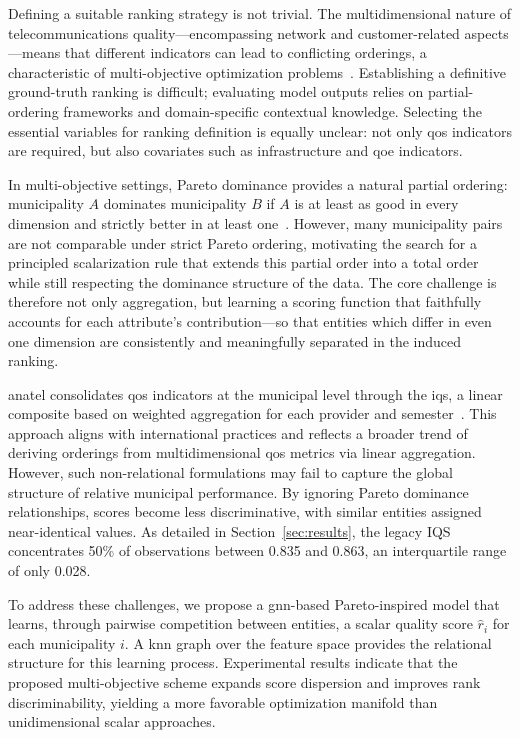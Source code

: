 \documentclass[english]{sbrt}
\begin{document}
Defining a suitable ranking strategy is not trivial. The multidimensional nature
of telecommunications quality---encompassing network and customer-related
aspects---means that different indicators can lead to conflicting orderings, a
characteristic of multi-objective optimization
problems~\cite{suresh2024machine,kesireddy2024elite}. Establishing a definitive
ground-truth ranking is difficult; evaluating model outputs relies on
partial-ordering frameworks and domain-specific contextual knowledge. Selecting
the essential variables for ranking definition is equally unclear: not only
\gls{qos} indicators are required, but also covariates such as infrastructure
and \gls{qoe} indicators.

In multi-objective settings, Pareto dominance provides a natural partial
ordering: municipality $A$ dominates municipality $B$ if $A$ is at least as good
in every dimension and strictly better in at least
one~\cite{haxhiraj2025pareto}. However, many municipality pairs are not
comparable under strict Pareto ordering, motivating the search for a principled
scalarization rule that extends this partial order into a total order while
still respecting the dominance structure of the data. The core challenge is
therefore not only aggregation, but learning a scoring function that faithfully
accounts for each attribute's contribution---so that entities which differ in
even one dimension are consistently and meaningfully separated in the induced
ranking.

\gls{anatel} consolidates \gls{qos} indicators at the municipal level through
the \gls{iqs}, a linear composite based on weighted aggregation for each
provider and semester~\cite{anatel2025ri444,anatel2021ri71}. This approach
aligns with international practices and reflects a broader trend of deriving
orderings from multidimensional \gls{qos} metrics via linear aggregation.
However, such non-relational formulations may fail to capture the global
structure of relative municipal performance. By ignoring Pareto dominance
relationships, scores become less discriminative, with similar entities assigned
near-identical values. As detailed in Section~\ref{sec:results}, the legacy IQS
concentrates 50\% of observations between 0.835 and 0.863, an interquartile
range of only 0.028.

To address these challenges, we propose a \gls{gnn}-based Pareto-inspired model
that learns, through pairwise competition between entities, a scalar quality
score $\hat{r}_i$ for each municipality $i$. A \gls{knn} graph over the feature
space provides the relational structure for this learning process. Experimental
results indicate that the proposed multi-objective scheme expands score
dispersion and improves rank discriminability, yielding a more favorable
optimization manifold than unidimensional scalar approaches.
\end{document}

